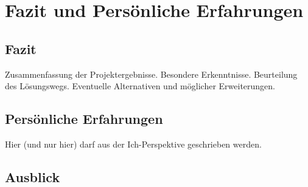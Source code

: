 



\chapter{Fazit und Persönliche Erfahrungen}


\section{Fazit}

Zusammenfassung der Projektergebnisse. 
Besondere Erkenntnisse. Beurteilung des Lösungswegs. Eventuelle Alternativen und möglicher Erweiterungen.

\section{Persönliche Erfahrungen}

Hier (und nur hier) darf aus der Ich-Perspektive geschrieben werden.

\section{Ausblick}